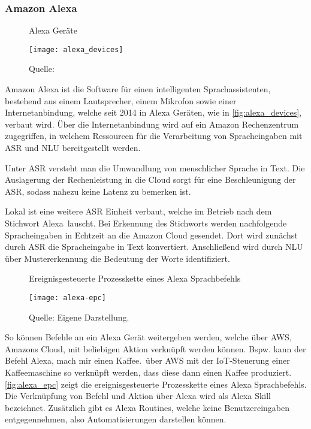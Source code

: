 \subsubsection{Amazon Alexa}

\begin{figure}[ht]
	\centering
	\caption{Alexa Geräte}
	\texttt{[image: alexa\_devices]}
	\caption*{\footnotesize{Quelle: }}
	\label{fig:alexa_devices}
\end{figure}

Amazon Alexa ist die Software für einen intelligenten Sprachassistenten, bestehend aus einem Lautsprecher, einem Mikrofon sowie einer Internetanbindung, welche seit 2014 in Alexa Geräten, wie in \autoref{fig:alexa_devices}, verbaut wird.
Über die Internetanbindung wird auf ein Amazon Rechenzentrum zugegriffen, in welchem Ressourcen für die Verarbeitung von Spracheingaben mit \ac{ASR} und \ac{NLU} bereitgestellt werden.

Unter \ac{ASR} versteht man die Umwandlung von menschlicher Sprache in Text.
Die Auslagerung der Rechenleistung in die Cloud sorgt für eine Beschleunigung der \ac{ASR}, sodass nahezu keine Latenz zu bemerken ist.

Lokal ist eine weitere \ac{ASR} Einheit verbaut, welche im Betrieb nach dem Stichwort \glqq Alexa\grqq \ lauscht.
Bei Erkennung des Stichworts werden nachfolgende Spracheingaben in Echtzeit an die Amazon Cloud gesendet.
Dort wird zunächst durch \ac{ASR} die Spracheingabe in Text konvertiert.
Anschließend wird durch \ac{NLU} über Mustererkennung die Bedeutung der Worte identifiziert. 

\begin{figure}[ht]
	\centering
	\caption{Ereignisgesteuerte Prozesskette eines Alexa Sprachbefehls}
	\texttt{[image: alexa-epc]}
	\caption*{\footnotesize{Quelle: Eigene Darstellung.}}
	\label{fig:alexa_epc}
\end{figure}

So können Befehle an ein Alexa Gerät weitergeben werden, welche über \ac{AWS}, Amazons Cloud, mit beliebigen Aktion verknüpft werden können.
Bspw. kann der Befehl \glqq Alexa, mach mir einen Kaffee.\grqq \ über \ac{AWS} mit der \ac{IoT}-Steuerung einer Kaffeemaschine so verknüpft werden, dass diese dann einen Kaffee produziert.
\autoref{fig:alexa_epc} zeigt die ereignisgesteuerte Prozesskette eines Alexa Sprachbefehls.
Die Verknüpfung von Befehl und Aktion über Alexa wird als \glqq Alexa Skill\grqq{} bezeichnet.
Zusätzlich gibt es \glqq Alexa Routines\grqq, welche keine Benutzereingaben entgegennehmen, also Automatisierungen darstellen können.

